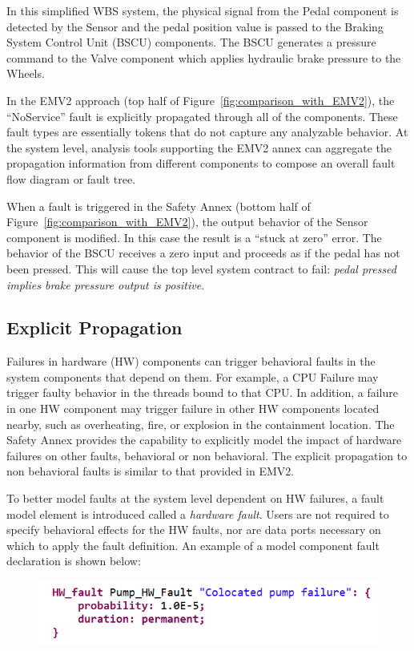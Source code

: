 In this simplified WBS system, the physical signal from the Pedal component is detected by the Sensor and the pedal position value is passed to the Braking System Control Unit (BSCU) components.  The BSCU generates a pressure command to the Valve component which applies hydraulic brake pressure to the Wheels. 

In the EMV2 approach (top half of Figure~\ref{fig:comparison_with_EMV2}), the ``NoService'' fault is explicitly propagated through all of the components. These fault types are essentially tokens that do not capture any analyzable behavior. At the system level, analysis tools supporting the EMV2 annex can aggregate the propagation information from different components to compose an overall fault flow diagram or fault tree. 

When a fault is triggered in the Safety Annex (bottom half of Figure~\ref{fig:comparison_with_EMV2}), the output behavior of the Sensor component is modified. In this case the result is a ``stuck at zero'' error. The behavior of the BSCU receives a zero input and proceeds as if the pedal has not been pressed. This will cause the top level system contract to fail: {\em pedal pressed implies brake pressure output is positive}.


\subsection{Explicit Propagation} 
Failures in hardware (HW) components can trigger behavioral faults in the system components that depend on them. For example, a CPU %
Failure may trigger faulty behavior in the threads bound to that CPU. In addition, a %
failure in one HW component may trigger %
failure in other HW components located nearby, such as overheating, fire, or explosion
in the containment location. 
The Safety Annex provides the capability to explicitly model the impact of hardware %
failures on other faults, behavioral or non behavioral. The explicit propagation to non behavioral faults is similar to that provided in EMV2.

To better model %
faults at the system level dependent on HW failures, a fault model element is introduced called a \textit{hardware fault}. Users are not required to specify behavioral effects for the HW faults, nor are data ports necessary on which to apply the fault definition. An example of a model component fault declaration is shown below:
\begin{figure}[h!]
	\vspace{-0.1in}
	\begin{center}
	\includegraphics[width=.6\textwidth]{images/hw_fault2.png}
	\end{center}
	\vspace{-0.3in}
	\label{fig:hwFault}
\end{figure}

